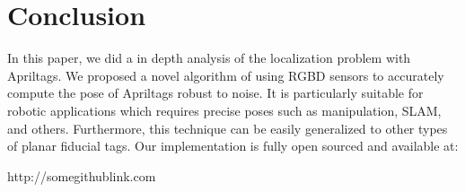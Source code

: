 \section{Conclusion}
\label{sec:conclusion}

In this paper, we did a in depth analysis of the localization problem with Apriltags. We proposed a novel algorithm of using RGBD sensors to accurately compute the pose of Apriltags robust to noise. It is particularly suitable for robotic applications which requires precise poses such as manipulation, SLAM, and others. Furthermore, this technique can be easily generalized to other types of planar fiducial tags. Our implementation is fully open sourced and available at:

	http://somegithublink.com
